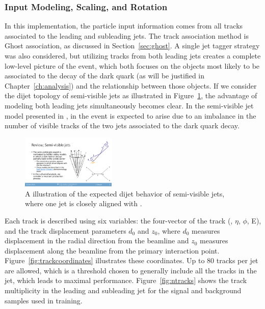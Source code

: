 \subsubsection{Input Modeling, Scaling, and Rotation}
\label{sec:input_model}
In this implementation, the particle input information comes from all tracks associated to the leading and subleading jets. The track association method is Ghost association, as discussed in Section~\ref{sec:ghost}. A single jet tagger strategy was also considered, but utilizing tracks from both leading jets creates a complete low-level picture of the event, which both focuses on the objects most likely to be associated to the decay of the dark quark (as will be justified in Chapter~\ref{ch:analysis}) and the relationship between those objects. If we consider the dijet topology of semi-visible jets as illustrated in Figure~\ref{fig:svj_pic}, the advantage of modeling both leading jets simultaneously becomes clear. In the semi-visible jet model presented in \cite{darkqcd}, \met in the event is expected to arise due to an imbalance in the number of visible tracks of the two jets associated to the dark quark decay.\par

\begin{figure}[!htbp]
\centering
   \includegraphics[width=0.4\textwidth]{figures/ml/dijet_topology}
    \caption{A illustration of the expected dijet behavior of semi-visible jets, where one jet is closely aligned with \met.
        \label{fig:svj_pic}}
\end{figure}

Each track is described using six variables: the four-vector of the track (\pt, $\eta$, $\phi$, E), and the track displacement parameters $d_0$ and $z_0$, where $d_0$ measures displacement in the radial direction from the beamline and $z_0$ measures displacement along the beamline from the primary interaction point. Figure~\ref{fig:trackcoordinates} illustrates these coordinates. Up to 80 tracks per jet are allowed, which is a threshold chosen to generally include all the tracks in the jet, which leads to maximal performance. Figure~\ref{fig:ntracks} shows the track multiplicity in the leading and subleading jet for the signal and background samples used in training. \par

